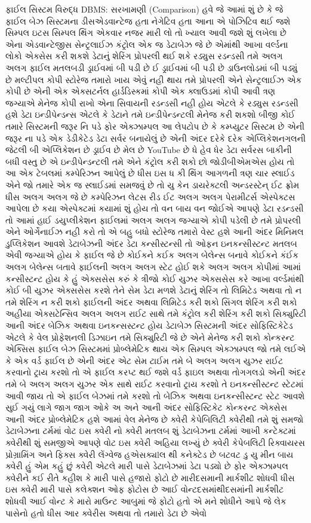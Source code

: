 \documentclass[aspectratio=169, 10pt]{beamer}
\begin{document}
\begin{frame}{ફાઈલ સિસ્ટમ વિરુદ્ધ DBMS: સરખામણી (Comparison)}
{હવે જે આમાં શું છે કે જે ફાઈલ બેઝ સિસ્ટમના ડીસએડવાન્ટેજ હતા નેગેટિવ હતા આના એ પોઝિટિવ થઈ જશે સિમ્પલ ઇટસ સિમ્પલ થિંગ એકવાર નજર મારી લો તો ખ્યાલ આવી જશે શું લખેલા છે એના એડવાન્ટેજીસ સેન્ટ્રલાઈઝ કંટ્રોલ એક જ ડેટાબેઝ જે છે એમાંથી આખા વર્લ્ડના લોકો એક્સેસ કરી શકશે ડેટાનું શેરિંગ પ્રોપરલી થઈ શકે રડ્યુસ રડન્ડસી તમે અલગ અલગ ફાઈલ મતલબડી ડ્રાઈવમાં બી પડી છે ઈ ડ્રાઈવમાં બી પડી છે ડાઉનલોડમાં બી પડ્યું છે મલ્ટીપલ કોપી સ્ટોરેજ તમારો ખાય એવું નહી થાય તમે પ્રોપરલી એને સેન્ટ્રલાઈઝ એક કોપી છે એની એક એક્સટર્નલ હાર્ડડિસ્કમાં કોપી એક ક્લાઉડમાં કોપી આવી ત્રણ જગ્યાએ મેનેજ કોપી રાખો એના સિવાયની રડન્ડસી નહી હોય એટલે કે રડ્યુસ રડન્ડસી હશે ડેટા ઇન્ડીપેન્ડન્સ એટલે કે ડેટાને તમે ઇન્ડીપેન્ડન્ટલી મેનેજ કરી શકશો બીજી કોઈ તમારે સિસ્ટમની જરૂર નિ પડે ફોર એક્ઝામ્પલ આ લેપટોપ છે કે કમ્પ્યુટર સિસ્ટમ છે એની જરૂર ના પડે એક ડેડીકેટેડ ડેટા સર્વર બનાયેલું છે એની અંદર દરેકે દરેક એપ્લિકેશનગલની જેટલી બી એપ્લિકેશન છે ડ્રાઈવ છે મેલ છે YouTube છે ધે હેવ ધેર ડેટા સર્વરસ બાકીની બધી વસ્તુ છે એ ઇન્ડીપેન્ડન્ટલી તમે એને કંટ્રોલ કરી શકો છો જોડીબીએમએસ હોય તો આ એક ટેબલમાં કમ્પેરિઝન આપેલું છે ધીસ ઇસ ધ કી થિંગ આગળની ત્રણ ચાર સ્લાઈડ એને જો તમારે એક જ સ્લાઈડમાં સમજવું છે તો યુ કેન ડાયરેક્ટલી અન્ડરસ્ટેન્ ઈટ ફ્રોમ ધીસ અલગ અલગ જે છે કમ્પેરિઝન લેટસ રીડ ઈટ અલગ અલગ પેરામીટર્સ એસ્પેક્ટસ આપેલા છે કયા એસ્પેક્ટમાં કયામાં શું હોય તો વન બાય વન જોઈએ આપણે ડેટા રડન્ડસી તો આમાં હાઈ ડયુપ્લીકેશન ફાઈલમાં અલગ અલગ જગ્યાએ કોપી પડેલી છે તમે પ્રોપરલી એને ઓર્ગેનાઈઝ નહી કરો તો એ બહુ બધો સ્ટોરેજ તમારો વેસ્ટ હશે આની અંદર મિનિમલ ડુપ્લિકેશન આવશે ડેટાબેઝની અંદર ડેટા કન્સીસ્ટન્સી તો ઓફન ઇનકન્સીસ્ટન્ટ મતલબ એવી જગ્યાએ હોય કે ફાઈલ જે છે કોઈકને કઈક અલગ બેલેન્સ બનાવે કોઈકને કંઈક અલગ બેલેન્સ બતાવે ફાઈલની અલગ અલગ સ્ટેટ હોઈ શકે અલગ અલગ કોપીમાં આમાં કન્સીસ્ટન્ટ હોય કે હું એક્સસેસ કરું કે ત્રીજો કોઈ યુઝર એક્સસેસ કરે આખા વર્લ્ડમાંથી કોઈ બી યુઝર એક્સસેસ કરશે તેને સેમ ડેટા મળશે ડેટાનું શેરિંગ તો લિમિટેડ અથવા તો ન તમે શેરિંગ ન કરી શકો ફાઈલની અંદર અથવા લિમિટેડ કરી શકો સિંગલ શેરિંગ કરી શકો અહીયા એક્સટેન્સિવ અલગ અલગ રાઈટ સાથે તમે કંટ્રોલ કરી શેરિંગ કરી શકો સિક્યુરિટી આની અંદર બેઝિક અથવા ઇનકન્સસ્ટન્ટ હોય ડેટાબેઝ સિસ્ટમની અંદર સોફિસ્ટિકેટેડ એટલે કે વેલ પ્રોફેશનલી ડિઝાઇન તમે સિક્યુરિટી જે છે એને મેનેજ કરી શકો કોન્કરન્ટ એક્સિસ ફાઈલ બેઝ સિસ્ટમમાં પ્રોબ્લેમેટિક થાય એક સિમ્પલ એક્ઝામ્પલ જો તમે લઈએ કે એક વર્ડ ફાઈલ છે એની અંદર એટ સેમ ટાઈમ તમે બે અલગ અલગ યુઝર રાઈટ કરવાનો ટ્રાય કરશો તો એ ફાઈલ કરપ્ટ થઈ જશે વર્ડ ફાઇલ અથવા તોગગલડો એની અંદર તમે બે અલગ અલગ યુઝર એક સાથે રાઈટ કરવાનો ટ્રાય કરશો તે ઇનકન્સીસ્ટન્ટ સ્ટેટમાં આવી જાય તો એ ફાઈલ બેઝમાં તમે કરશો તો બેઝિક અથવા ઇનકન્સીસ્ટન્ટ સ્ટેટ આવશે સુઈ ગયું લાગે જાગ જાગ ઓકે અ અને આની અંદર સોફિસ્ટિકેટ કોન્કરન્ટ એક્સેસ આની અંદર પ્રોબ્લેમેટિક હશે આમાં વેલ મેનેજ છે ક્વેરી કેપેબિલિટી ક્વેરીથી તમે શું સમજો ડેટાબેઝના ટર્મમાં વોટ ઇસ ક્વેરી નો ક્વેરી મતલબ શું ડેટાબેઝના ટર્મમાં આખી કન્ટેક્ટમાં ક્વેરીથી શું સમજીએ આપણે વોટ ઇસ ક્વેરી અહિયા લખ્યું છે ક્વેરી કેપેબલિટી રિક્વાયરસ પ્રોગ્રામિંગ અને ફિક્સ ક્વેરી લેંગ્વેજ હએસક્યlલ થી કનેક્ટેડ છે બટવટ ડુ યુ મીન બાય ક્વેરી હું એમ કહું છું ક્વેરી એટલે મારી પાસે ડેટાબેઝમાં ડેટા પડ્યો છે ફોર એક્ઝામ્પલ ક્વેરીને કઈ રીતે કહીશ કે મારી પાસે હજારો ફોટો છે મારીદસમાની માર્કશીટ શોધવી ધીસ ઇસ ક્વેરી મારી પાસે કલેક્શન ઓફ ફોટોસ છે આઈ વોન્ટદસમાંથીદસમાંની માર્કશીટ શોધવી આઈ વોન્ટ કે મારો માઉન્ટ આબુમાં જે ફોટો હતો એ મને શોધીને આપે જે લેક પાસેનો હતો ધીસ આર ક્વેરીસ અથવા તો તમારો ડેટા છે એવો }
\end{frame}
\end{document}
